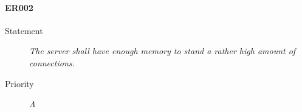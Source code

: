 \paragraph{ER002}
  \begin{description}
  \item [Statement] 
    \textit{ The server shall have enough memory to stand a rather high amount of connections.}
  \item [Priority] \textit{A}
\end{description}